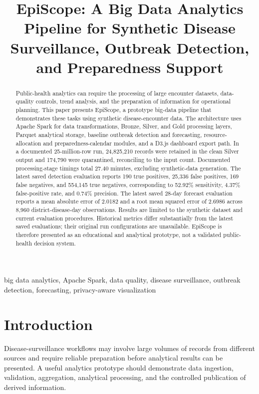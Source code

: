 \documentclass[conference]{IEEEtran}
\title{EpiScope: A Big Data Analytics Pipeline for Synthetic Disease Surveillance, Outbreak Detection, and Preparedness Support}
\author{
\IEEEauthorblockN{Md. Samin Osman (0222220005101042) \\ Robiul Hassan (0222220005101043) \\ Walid Talal (0222220005101045) \\ Md. Mahafujul Alam (0222220005101066)}
\IEEEauthorblockA{
Department of Computer Science and Engineering\\
Premier University, Chattogram, Bangladesh
}
}
\begin{document}
\maketitle

\begin{abstract}
Public-health analytics can require the processing of large encounter datasets, data-quality controls, trend analysis, and the preparation of information for operational planning. This paper presents EpiScope, a prototype big-data pipeline that demonstrates these tasks using synthetic disease-encounter data. The architecture uses Apache Spark for data transformations, Bronze, Silver, and Gold processing layers, Parquet analytical storage, baseline outbreak detection and forecasting, resource-allocation and preparedness-calendar modules, and a D3.js dashboard export path. In a documented 25-million-row run, 24,825,210 records were retained in the clean Silver output and 174,790 were quarantined, reconciling to the input count. Documented processing-stage timings total 27.40 minutes, excluding synthetic-data generation. The latest saved detection evaluation reports 190 true positives, 25,336 false positives, 169 false negatives, and 554,145 true negatives, corresponding to 52.92\% sensitivity, 4.37\% false-positive rate, and 0.74\% precision. The latest saved 28-day forecast evaluation reports a mean absolute error of 2.0182 and a root mean squared error of 2.6986 across 8,960 district-disease-day observations. Results are limited to the synthetic dataset and current evaluation procedures. Historical metrics differ substantially from the latest saved evaluations; their original run configurations are unavailable. EpiScope is therefore presented as an educational and analytical prototype, not a validated public-health decision system.
\end{abstract}

\begin{IEEEkeywords}
big data analytics, Apache Spark, data quality, disease surveillance, outbreak detection, forecasting, privacy-aware visualization
\end{IEEEkeywords}

\section{Introduction}

Disease-surveillance workflows may involve large volumes of records from different sources and require reliable preparation before analytical results can be presented. A useful analytics prototype should demonstrate data ingestion, validation, aggregation, analytical processing, and the controlled publication of derived information.
\end{document}
